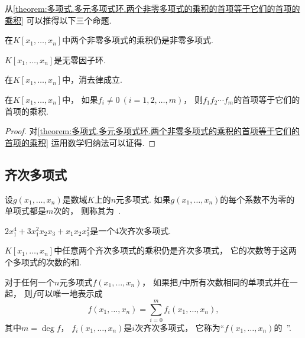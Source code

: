 从\cref{theorem:多项式.多元多项式环.两个非零多项式的乘积的首项等于它们的首项的乘积}
可以推得以下三个命题.

\begin{proposition}
在\(K[x_1,\dotsc,x_n]\)中两个非零多项式的乘积仍是非零多项式.
\end{proposition}

\begin{proposition}
\(K[x_1,\dotsc,x_n]\)是无零因子环.
\end{proposition}

\begin{proposition}
在\(K[x_1,\dotsc,x_n]\)中，消去律成立.
\end{proposition}

\begin{corollary}
在\(K[x_1,\dotsc,x_n]\)中，
如果\(f_i\neq0\ (i=1,2,\dotsc,m)\)，
则\(f_1 f_2 \dotsm f_m\)的首项等于它们的首项的乘积.
\begin{proof}
对\cref{theorem:多项式.多元多项式环.两个非零多项式的乘积的首项等于它们的首项的乘积}
运用数学归纳法可以证得.
\end{proof}
\end{corollary}

\subsection{齐次多项式}
\begin{definition}
设\(g(x_1,\dotsc,x_n)\)是数域\(K\)上的\(n\)元多项式.
如果\(g(x_1,\dotsc,x_n)\)的每个系数不为零的单项式都是\(m\)次的，
则称其为~.
\end{definition}

\begin{example}
\(2x_1^4+3x_1^2x_2x_3+x_1x_2x_3^2\)是一个4次齐次多项式.
\end{example}

\begin{proposition}
\(K[x_1,\dotsc,x_n]\)中任意两个齐次多项式的乘积仍是齐次多项式，
它的次数等于这两个多项式的次数的和.
\end{proposition}

对于任何一个\(n\)元多项式\(f(x_1,\dotsc,x_n)\)，
如果把\(f\)中所有次数相同的单项式并在一起，
则\(f\)可以唯一地表示成\[
	f(x_1,\dotsc,x_n)
	=\sum_{i=0}^m
	f_i(x_1,\dotsc,x_n),
\]
其中\(m=\deg f\)，
\(f_i(x_1,\dotsc,x_n)\)是\(i\)次齐次多项式，
它称为“\(f(x_1,\dotsc,x_n)\)的~”.

